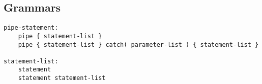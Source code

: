 \documentclass[./LRM_main.tex]{subfiles}
\begin{document}
\begin{comment}
\subsection{And Then There Were Two}
Consider the terms \textit{pipelineX} to refer to a sequence of functions arranged in a pipeline as detailed in the section \textit{My First Pipeline}, where X is a number serving as a unique ID for
the pipeline. Now consider the two distinct pipelines, \textit{pipeline0} and \textit{pipeline1}. Both pipelines contain functions which are blocking, waiting for the results of an I/O operation. The two pipelines are arranged as such in code:
\begin{lstlisting}
pipeline0;
pipeline1;
\end{lstlisting}
Let's mimic the flow of a real program as it executes the two lines above. \textit{Pipeline0} is executed and runs until there is a blocking operation. As soon as a blocking operation is encountered,
the program moves it off of the main thread, and then on the main thread continues on to execute \textit{pipeline1}. The functions in pipeline1 will execute until one blocks, at which point this pipeline1 will also be queued and moved off the main thread. The main thread will continue executing any code after pipeline1. When the blocking function in pipeline0 or pipeline1 returns, the corresponding pipeline resumes execution.   


\subsection{Data and Pipelines}
If there is a blocking I/O operation, it must be put in a pipeline or the return value for the blocking function may be filled with junk or a null value, and this erroneous value could be used immediately if the next line makes use of the variable. Pipelines should be treated as islands of data, in that functions which depend on (take as arguments) values returned from blocking functions can only execute after the blocking function returns, which is unpredictable. In that sense, functions that are data dependent and relate to a particular instance or type of I/O operation should likely be encapsulated in a single pipeline. 
\end{comment}
\subsection{Grammars}
\begin{lstlisting}
pipe-statement:
	pipe { statement-list }
	pipe { statement-list } catch( parameter-list ) { statement-list }

statement-list:
    statement
    statement statement-list
\end{lstlisting}
\end{document}
